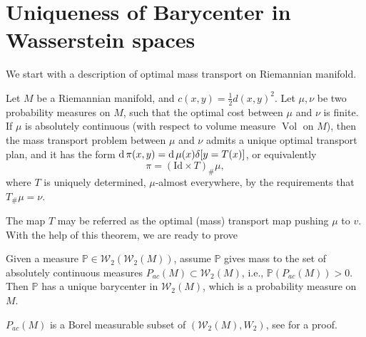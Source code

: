 \section{Uniqueness of Barycenter in Wasserstein spaces}

We start with a description \cite[Theorem 10.41]{villani2008optimal}
of optimal mass transport on Riemannian manifold.
\begin{thm}
	\label{thm:uniquness_monge_problem_manifold}
	Let \( M \) be a Riemannian manifold, and \( c ( x , y ) = \frac{1}{2} d ( x , y ) ^ { 2 } \).
	Let \( \mu , \nu \) be two probability measures on \( M \), such that the optimal cost
	between \( \mu \) and \( \nu \) is finite.
	If \( \mu \) is absolutely continuous (with respect to volume measure $\operatorname{Vol}$ on $M$),
	then the mass transport
	problem between \( \mu \) and \( \nu \) admits a unique optimal transport plan, and it
	has the form \( \operatorname{d} \pi ( x , y ) = \operatorname{d} \mu ( x ) \delta [ y = T ( x ) ] \),
	or equivalently \[ \pi = ( \mathrm { Id } \times T )_{\#} \mu , \]
	where \( T \) is uniquely determined, \( \mu \)-almost everywhere,
	by the requirements that \( T_{\#} \mu = \nu \).
\end{thm}

The map \( T \) may be referred as
the optimal (mass) transport map pushing \( \mu \) to \( v \).
With the help of this theorem, we are ready to prove
\begin{prop}
	\label{prop:uniquness_barycenter_Wasserstein}
	Given a measure $\mathbb{P} \in \mathcal{W}_2(\mathcal{W}_2(M))$,
	assume $\mathbb{P}$ gives mass to the set of absolutely continuous measures $P_{ac}(M) \subset \mathcal{W}_2(M)$,
	i.e.,	$\mathbb{P}(P_{ac}(M)) > 0 $.
	Then $\mathbb{P}$ has a unique barycenter in $\mathcal{W}_2(M)$, which is a probability measure on $M$.
\end{prop}

\begin{rmk}
	$P_{ac}(M)$ is a Borel measurable subset of $(\mathcal{W}_2(M), W_2)$,
	see \cite[Proposition 2.1]{KIM2017640} for a proof.
\end{rmk}

